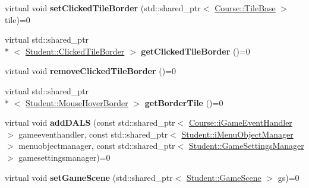 \begin{DoxyCompactItemize}
\item 
\hypertarget{class_course_1_1i_object_manager_a172c5b32495ed4d90a8750f8a2902247}{virtual void {\bfseries set\-Clicked\-Tile\-Border} (std\-::shared\-\_\-ptr$<$ \hyperlink{class_course_1_1_tile_base}{Course\-::\-Tile\-Base} $>$ tile)=0}\label{class_course_1_1i_object_manager_a172c5b32495ed4d90a8750f8a2902247}

\item 
\hypertarget{class_course_1_1i_object_manager_aac6397ee67cf552678d029ad19c7362e}{virtual std\-::shared\-\_\-ptr\\*
$<$ \hyperlink{class_student_1_1_clicked_tile_border}{Student\-::\-Clicked\-Tile\-Border} $>$ {\bfseries get\-Clicked\-Tile\-Border} ()=0}\label{class_course_1_1i_object_manager_aac6397ee67cf552678d029ad19c7362e}

\item 
\hypertarget{class_course_1_1i_object_manager_aa41734de21bab8cd99b6142d8faa3a8b}{virtual void {\bfseries remove\-Clicked\-Tile\-Border} ()=0}\label{class_course_1_1i_object_manager_aa41734de21bab8cd99b6142d8faa3a8b}

\item 
\hypertarget{class_course_1_1i_object_manager_ae05c8b287fce2f9e5f07cdbb8caa6101}{virtual std\-::shared\-\_\-ptr\\*
$<$ \hyperlink{class_student_1_1_mouse_hover_border}{Student\-::\-Mouse\-Hover\-Border} $>$ {\bfseries get\-Border\-Tile} ()=0}\label{class_course_1_1i_object_manager_ae05c8b287fce2f9e5f07cdbb8caa6101}

\item 
\hypertarget{class_course_1_1i_object_manager_a05b87f5611e355a016e9f58b5b10996a}{virtual void {\bfseries add\-D\-A\-L\-S} (const std\-::shared\-\_\-ptr$<$ \hyperlink{class_course_1_1i_game_event_handler}{Course\-::i\-Game\-Event\-Handler} $>$ gameeventhandler, const std\-::shared\-\_\-ptr$<$ \hyperlink{class_student_1_1i_menu_object_manager}{Student\-::i\-Menu\-Object\-Manager} $>$ menuobjectmanager, const std\-::shared\-\_\-ptr$<$ \hyperlink{class_student_1_1_game_settings_manager}{Student\-::\-Game\-Settings\-Manager} $>$ gamesettingsmanager)=0}\label{class_course_1_1i_object_manager_a05b87f5611e355a016e9f58b5b10996a}

\item 
\hypertarget{class_course_1_1i_object_manager_a3a776c88c5368dd7c1bda0c8f32deba8}{virtual void {\bfseries set\-Game\-Scene} (std\-::shared\-\_\-ptr$<$ \hyperlink{class_student_1_1_game_scene}{Student\-::\-Game\-Scene} $>$ gs)=0}\label{class_course_1_1i_object_manager_a3a776c88c5368dd7c1bda0c8f32deba8}


\end{DoxyCompactItemize}
